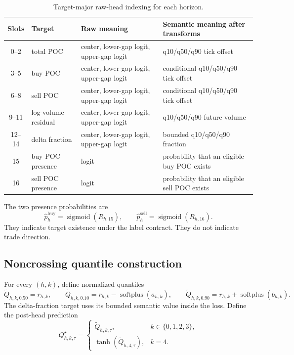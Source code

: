 \documentclass[10pt,letterpaper]{article}
\numberwithin{equation}{section}
\newcommand{\softplus}{\operatorname{softplus}}
\newcommand{\sigmoid}{\operatorname{sigmoid}}
\theoremstyle{definition}
\theoremstyle{remark}
\begin{document}
\begin{table}[!htbp]
\centering
\small
\begin{tabularx}{\textwidth}{@{}c l l Y@{}}
\toprule
\textbf{Slots} & \textbf{Target} & \textbf{Raw meaning} & \textbf{Semantic meaning after transforms}\\
--2 & total POC & center, lower-gap logit, upper-gap logit & q10/q50/q90 tick offset\\
3--5 & buy POC & center, lower-gap logit, upper-gap logit & conditional q10/q50/q90 tick offset\\
6--8 & sell POC & center, lower-gap logit, upper-gap logit & conditional q10/q50/q90 tick offset\\
9--11 & log-volume residual & center, lower-gap logit, upper-gap logit & q10/q50/q90 future volume\\
12--14 & delta fraction & center, lower-gap logit, upper-gap logit & bounded q10/q50/q90 fraction\\
15 & buy POC presence & logit & probability that an eligible buy POC exists\\
16 & sell POC presence & logit & probability that an eligible sell POC exists\\
\bottomrule
\end{tabularx}
\caption{Target-major raw-head indexing for each horizon.}
\label{tab:raw-index}
\end{table}

The two presence probabilities are
\begin{equation}
\widehat p_h^{\mathrm{buy}}=\sigmoid(R_{h,15}),\qquad
\widehat p_h^{\mathrm{sell}}=\sigmoid(R_{h,16}).
\label{eq:presence-probabilities}
\end{equation}
They indicate target existence under the label contract. They do not indicate
trade direction.

\subsection{Noncrossing quantile construction}

For every $(h,k)$, define normalized quantiles
\begin{equation}
\widetilde Q_{h,k,0.50}=r_{h,k},\qquad
\widetilde Q_{h,k,0.10}=r_{h,k}-\softplus(a_{h,k}),\qquad
\widetilde Q_{h,k,0.90}=r_{h,k}+\softplus(b_{h,k}).
\label{eq:ordered-head}
\end{equation}
The delta-fraction target uses its bounded semantic value inside the loss. Define
the post-head prediction
\begin{equation}
Q^\star_{h,k,\tau}=
\begin{cases}
\widetilde Q_{h,k,\tau},&k\in\{0,1,2,3\},\\
\tanh(\widetilde Q_{h,4,\tau}),&k=4.
\end{cases}
\label{eq:semantic-quantiles}
\end{equation}
\end{document}
